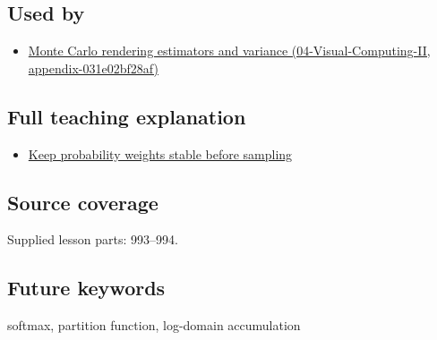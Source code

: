 \subsection{Used by}\label{used-by}

\begin{itemize}
\tightlist
\item
  \href{}{Monte Carlo rendering estimators and variance (04-Visual-Computing-II, appendix-031e02bf28af)}
\end{itemize}

\subsection{Full teaching explanation}\label{full-teaching-explanation}

\begin{itemize}
\tightlist
\item
  \href{Continuous\%20Notes/Computing\%20Foundations\%20-\%20From\%20Bits\%20to\%20C++\%20and\%20Systems\%20APIs\#Keep\%20probability\%20weights\%20stable\%20before\%20sampling}{Keep probability weights stable before sampling}
\end{itemize}

\subsection{Source coverage}\label{source-coverage}

Supplied lesson parts: 993--994.

\subsection{Future keywords}\label{future-keywords}

softmax, partition function, log-domain accumulation
